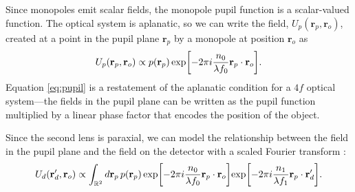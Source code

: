 \documentclass[]{osa-article}
\let\originalleft\left
\let\originalright\right
\renewcommand{\left}{\mathopen{}\mathclose\bgroup\originalleft}
\renewcommand{\right}{\aftergroup\egroup\originalright}
\providecommand{\ro}{\mathbf{\mathbf{r}}_o}
\providecommand{\rp}{\mathbf{r}_p}
\providecommand{\rd}{\mathbf{r}_d}
\providecommand{\mbb}[1]{\mathbb{#1}}
\begin{document}
Since monopoles emit scalar fields, the monopole pupil function is a
scalar-valued function. The optical system is aplanatic, so we can write the
field, $U_p(\rp, \ro)$, created at a point in the pupil plane $\rp$ by a
monopole at position $\ro$ as
\begin{align}
   U_p(\rp, \ro) \propto p(\rp)\,\text{exp}\left[-2\pi i \frac{n_0}{\lambda f_0} \rp\cdot\ro \right]. \label{eq:pupil}
\end{align}
Equation \eqref{eq:pupil} is a restatement of the aplanatic condition for a $4f$
optical system---the fields in the pupil plane can be written as the pupil
function multiplied by a linear phase factor that encodes the position of the
object.

Since the second lens is paraxial, we can model the relationship between the
field in the pupil plane and the field on the detector with a scaled Fourier
transform \cite{goodman1996, axelrod2012, backer2014}:
\begin{align}
   U_d(\rd', \ro) \propto \int_{\mbb{R}^2}d\rp\, p(\rp)\,\text{exp}\left[-2\pi i \frac{n_0}{\lambda f_0} \rp\cdot\ro \right]\text{exp}\left[-2\pi i \frac{n_1}{\lambda f_1} \rp\cdot\rd' \right]. \label{eq:detectorfourier}
\end{align}
\end{document}
